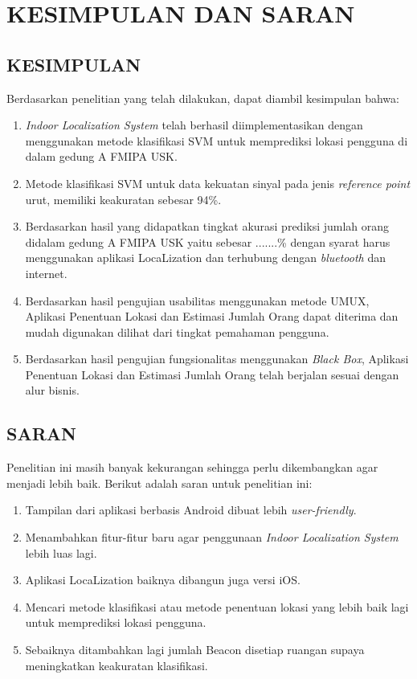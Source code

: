 \fancyhf{}
\fancyfoot[C]{\thepage}
\chapter{KESIMPULAN DAN SARAN}

\section{\uppercase{KESIMPULAN}}
Berdasarkan penelitian yang telah dilakukan, dapat diambil kesimpulan bahwa:
\begin{enumerate}
	\item \textit{Indoor Localization System} telah berhasil diimplementasikan dengan menggunakan metode klasifikasi SVM untuk memprediksi lokasi pengguna di dalam gedung A FMIPA USK.
	\item Metode klasifikasi SVM untuk data kekuatan sinyal pada jenis \textit{reference point} urut, memiliki keakuratan sebesar 94\%.
	\item  Berdasarkan hasil yang didapatkan tingkat akurasi prediksi jumlah orang didalam gedung A FMIPA USK yaitu sebesar .......\% dengan syarat harus menggunakan aplikasi LocaLization dan terhubung dengan \textit{bluetooth} dan internet.
	\item Berdasarkan hasil pengujian usabilitas menggunakan metode UMUX, Aplikasi Penentuan Lokasi dan Estimasi Jumlah Orang dapat diterima dan mudah digunakan dilihat dari tingkat pemahaman pengguna.
	\item Berdasarkan hasil pengujian fungsionalitas menggunakan \textit{Black Box}, Aplikasi Penentuan Lokasi dan Estimasi Jumlah Orang telah berjalan sesuai dengan alur bisnis.
\end{enumerate}



\section{\uppercase{SARAN}}

Penelitian ini masih banyak kekurangan sehingga perlu dikembangkan agar menjadi lebih baik. Berikut adalah saran untuk penelitian ini:
\begin{enumerate}
	\item Tampilan dari aplikasi berbasis Android dibuat lebih \textit{user-friendly}.
	\item Menambahkan fitur-fitur baru agar penggunaan \textit{Indoor Localization System} lebih luas lagi.
	\item Aplikasi LocaLization baiknya dibangun juga  versi iOS.
	\item Mencari metode klasifikasi atau metode penentuan lokasi yang lebih baik lagi untuk memprediksi lokasi pengguna.
	\item Sebaiknya ditambahkan lagi jumlah Beacon disetiap ruangan supaya meningkatkan keakuratan klasifikasi.

\end{enumerate}

\fancyhf{}
\fancyfoot[R]{\thepage}

\begin{comment}

\end{comment}
